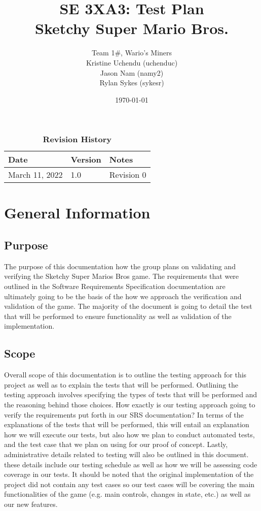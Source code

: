 \documentclass[12pt, titlepage]{article}
\title{SE 3XA3: Test Plan\\Sketchy Super Mario Bros.}
\author{Team 1\#, Wario's Miners
		\\ Kristine Uchendu (uchenduc)
		\\ Jason Nam (namy2)
		\\ Rylan Sykes (sykesr)
}
\date{\today}
\begin{document}
\maketitle

\tableofcontents
\listoftables
\listoffigures

\begin{table}[bp]
\caption{\bf Revision History}
\begin{tabularx}{\textwidth}{p{3cm}p{2cm}X}
\toprule {\bf Date} & {\bf Version} & {\bf Notes}\\
\midrule
March 11, 2022 & 1.0 & Revision 0\\
\bottomrule
\end{tabularx}
\end{table}

\newpage


\section{General Information}

\subsection{Purpose}

The purpose of this documentation how the group plans on validating and verifying the Sketchy Super Marios Bros game. The requirements that were outlined in the Software Requirements Specification documentation are ultimately going to be the basis of the how we approach the verification and validation of the game. The majority of the document is going to detail the test that will be performed to ensure functionality as well as validation of the implementation.
\subsection{Scope}

Overall scope of this documentation is to outline the testing approach for this project as well as to explain the tests that will be performed. Outlining the testing approach involves specifying the types of tests that will be performed and the reasoning behind those choices. How exactly is our testing approach going to verify the requirements put forth in our SRS documentation? In terms of the explanations of the tests that will be performed, this will entail an explanation how we will execute our tests, but also how we plan to conduct automated tests, and the test case that we plan on using for our proof of concept. Lastly, administrative details related to testing will also be outlined in this document. these details include our testing schedule as well as how we will be assessing code coverage in our tests. It should be noted that the original implementation of the project did not contain any test cases so our test cases will be covering the main functionalities of the game (e.g. main controls, changes in state, etc.) as well as our new features.
\end{document}
